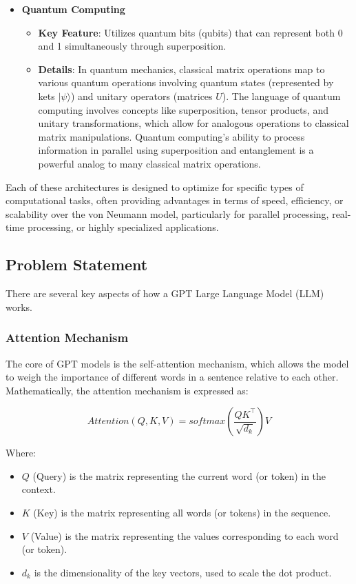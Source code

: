 \documentclass{article}
\begin{document}
\begin{itemize}
    \item{\textbf{Quantum Computing}}
    \begin{itemize}
        \item{\textbf{Key Feature}}: Utilizes quantum bits (qubits) that can represent both 0 and 1 simultaneously through superposition.
        \item{\textbf{Details}}: In quantum mechanics, classical matrix operations map to various quantum operations involving quantum states (represented by kets \( |\psi\rangle \)) and unitary operators (matrices \( U \)). The language of quantum computing involves concepts like superposition, tensor products, and unitary transformations, which allow for analogous operations to classical matrix manipulations. Quantum computing’s ability to process information in parallel using superposition and entanglement is a powerful analog to many classical matrix operations.
    \end{itemize}
\end{itemize}

Each of these architectures is designed to optimize for specific types of computational tasks, often providing advantages in terms of speed, efficiency, or scalability over the von Neumann model, particularly for parallel processing, real-time processing, or highly specialized applications.


\subsection{Problem Statement}

There are several key aspects of how a GPT Large Language Model (LLM) works.

\subsubsection{Attention Mechanism}

The core of GPT models is the self-attention mechanism, which allows the model to weigh the importance of different words in a sentence relative to each other. Mathematically, the attention mechanism is expressed as:

\[ \textit{Attention}(Q, K, V) = \textit{softmax}\left(\frac{QK^\top}{\sqrt{d_k}}\right)V \]

Where:
\begin{itemize}
    \item \( Q \) (Query) is the matrix representing the current word (or token) in the context.
    \item \( K \) (Key) is the matrix representing all words (or tokens) in the sequence.
    \item \( V \) (Value) is the matrix representing the values corresponding to each word (or token).
    \item \( d_k \) is the dimensionality of the key vectors, used to scale the dot product.
\end{itemize}
\end{document}
